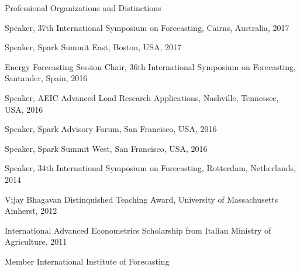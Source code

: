 \documentclass{resume} %
\begin{document}
\begin{rSection}{Professional Organizations and Distinctions}


\item Speaker, 37th International Symposium on Forecasting, Cairns, Australia, 2017
\item Speaker, Spark Summit East, Boston, USA, 2017
\item Energy Forecasting Session Chair, 36th International Symposium on Forecasting, Santander, Spain, 2016
\item Speaker, AEIC Advanced Load Research Applications, Nashville, Tennessee, USA, 2016
\item Speaker, Spark Advisory Forum, San Francisco, USA, 2016
\item Speaker, Spark Summit West, San Francisco, USA, 2016
\item Speaker, 34th International Symposium on Forecasting, Rotterdam, Netherlands, 2014
\item Vijay Bhagavan Distinquished Teaching Award, University of Massachusetts Amherst, 2012
\item International Advanced Econometrics Scholarship from Italian Ministry of Agriculture, 2011
\item Member International Institute of Forecasting

\end{rSection}
\end{document}
